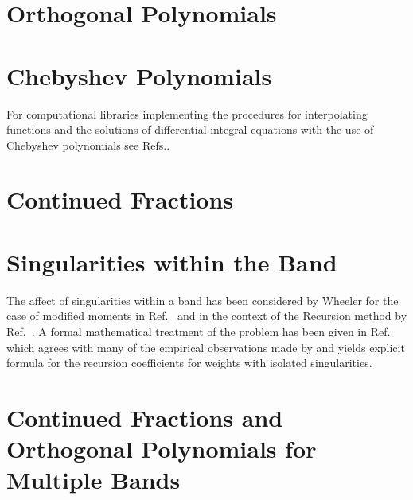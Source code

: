 \section{Orthogonal Polynomials}

\section{Chebyshev Polynomials}

For computational libraries implementing the procedures
for interpolating functions and the solutions of differential-integral
equations with the use of Chebyshev polynomials see Refs.\cite{nex80,daguano83}.

\section{Continued Fractions}

\section{Singularities within the Band}
The affect of singularities within a band has 
been considered by Wheeler for the case of modified moments in
Ref.~\cite{wheeler74} and in the context of the Recursion method by Ref.~\cite{hodges77}.
A formal mathematical treatment of the problem has been given in Ref.~\cite{vanlessen03} which
agrees with many of the empirical observations made by and yields explicit formula
for the recursion coefficients for weights with isolated singularities.


\section{Continued Fractions and Orthogonal Polynomials for Multiple Bands}


